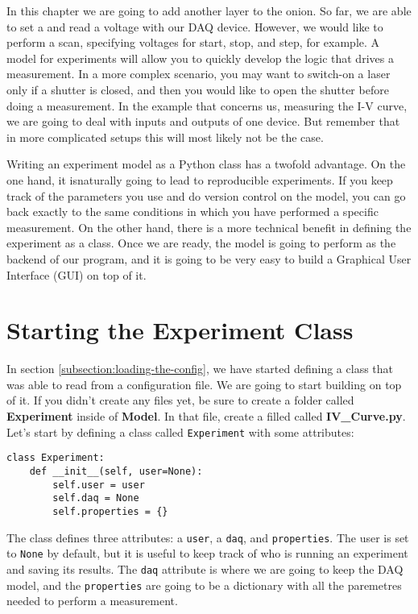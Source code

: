 In this chapter we are going to add another layer to the onion. So far, we are able to set a and read a voltage with our DAQ device. However, we would like to perform a scan, specifying voltages for start, stop, and step, for example. A model for experiments will allow you to quickly develop the logic that drives a measurement. In a more complex scenario, you may want to switch-on a laser only if a shutter is closed, and then you would like to open the shutter before doing a measurement. In the example that concerns us, measuring the  I-V curve, we are going to deal with inputs and outputs of one device. But remember that in more complicated setups this will most likely not be the case.

Writing an experiment model as a Python class has a twofold advantage. On the one hand, it isnaturally going to lead to reproducible experiments. If you keep track of the parameters you use and do version control on the model, you can go back exactly to the same conditions in which you have performed a specific measurement. On the other hand, there is a more technical benefit in defining the experiment as a class. Once we are ready, the model is going to perform as the backend of our program, and it is going to be very easy to build a Graphical User Interface ({GUI}) on top of it.

\section{Starting the Experiment Class}\label{starting-the-experimentclass}
In section \ref{subsection:loading-the-config}, we have started defining a class that was able to read from a configuration file. We are going to start building on top of it. If you didn't create any files yet, be sure to create a folder called \textbf{Experiment} inside of \textbf{Model}. In that file, create a filled called  \textbf{IV\_Curve.py}. Let's start by defining a class called \texttt{Experiment} with some attributes: 

\begin{verbatim}
class Experiment:
    def __init__(self, user=None):
        self.user = user
        self.daq = None
        self.properties = {}
\end{verbatim}

The class defines three attributes: a \texttt{user}, a \texttt{daq}, and \texttt{properties}. The user is set to \texttt{None} by default, but it is useful to keep track of who is running an experiment and saving its results. The \texttt{daq} attribute is where we are going to keep the DAQ model, and the \texttt{properties} are going to be a dictionary with all the paremetres needed to perform a measurement. 

